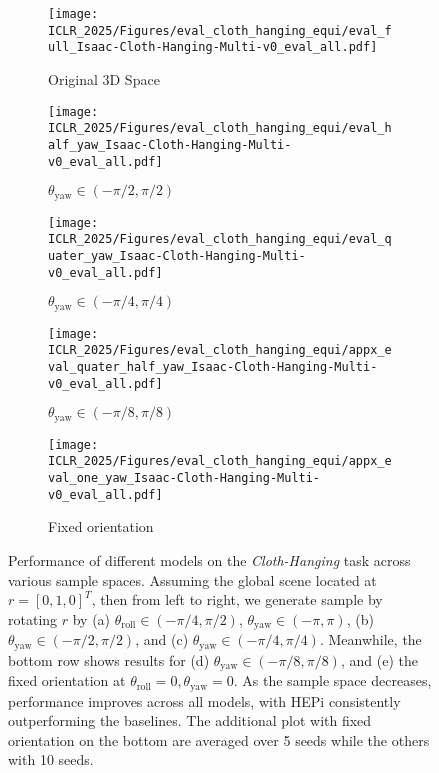 \begin{figure*}[t]
    \makebox[\textwidth][c]{
    
    }
    \centering
    \begin{subfigure}[b]{0.32\linewidth}
        \texttt{[image: ICLR\_2025/Figures/eval\_cloth\_hanging\_equi/eval\_full\_Isaac-Cloth-Hanging-Multi-v0\_eval\_all.pdf]}
        \caption{Original 3D Space}
    \end{subfigure}
    \hfill
    \begin{subfigure}[b]{0.32\linewidth}
        \texttt{[image: ICLR\_2025/Figures/eval\_cloth\_hanging\_equi/eval\_half\_yaw\_Isaac-Cloth-Hanging-Multi-v0\_eval\_all.pdf]}
        \caption{$\theta_{\text{yaw}} \in (-\pi/2, \pi/2)$}
    \end{subfigure}
    \hfill
    \begin{subfigure}[b]{0.32\linewidth}
        \texttt{[image: ICLR\_2025/Figures/eval\_cloth\_hanging\_equi/eval\_quater\_yaw\_Isaac-Cloth-Hanging-Multi-v0\_eval\_all.pdf]}
        \caption{$\theta_{\text{yaw}} \in (-\pi/4, \pi/4)$}
    \end{subfigure}
    
    \medskip
    \begin{minipage}{0.65\textwidth}
    \centering
    \begin{subfigure}[b]{0.49\linewidth}
        \texttt{[image: ICLR\_2025/Figures/eval\_cloth\_hanging\_equi/appx\_eval\_quater\_half\_yaw\_Isaac-Cloth-Hanging-Multi-v0\_eval\_all.pdf]}
        \caption{$\theta_{\text{yaw}}\in (-\pi/8, \pi/8)$}
    \end{subfigure}
    \hfill
    \begin{subfigure}[b]{0.49\linewidth}
        \texttt{[image: ICLR\_2025/Figures/eval\_cloth\_hanging\_equi/appx\_eval\_one\_yaw\_Isaac-Cloth-Hanging-Multi-v0\_eval\_all.pdf]}
        \caption{Fixed orientation}
    \end{subfigure}
    \end{minipage}
    \caption{Performance of different models on the \emph{Cloth-Hanging} task across various sample spaces. Assuming the global scene located at $r=[0,1,0]^T$, then from left to right, we generate sample by rotating $r$ by (a) $\theta_{\text{roll}} \in (-\pi/4, \pi/2)$, $\theta_{\text{yaw}} \in (-\pi, \pi)$, (b) $\theta_{\text{yaw}} \in (-\pi/2, \pi/2)$, and (c) $\theta_{\text{yaw}} \in (-\pi/4, \pi/4)$. Meanwhile, the bottom row shows results for (d) $\theta_{\text{yaw}}\in (-\pi/8, \pi/8)$, and (e) the fixed orientation at $\theta_{\text{roll}}=0, \theta_{\text{yaw}}=0$. As the sample space decreases, performance improves across all models, with HEPi consistently outperforming the baselines. The additional plot with fixed orientation on the bottom are averaged over 5 seeds while the others with 10 seeds.}
    \vspace{-0.2cm}
    \label{fig:appx_eval_equi}
\end{figure*}
